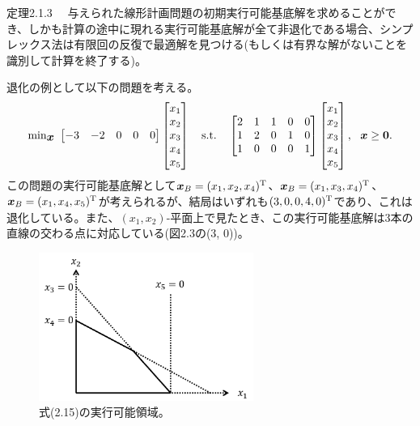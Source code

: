 \documentclass[dvipdfmx, 9pt, a4paper]{jsarticle}
\numberwithin{equation}{section}
\newcommand{\bm}[1]{{\mbox{\boldmath $#1$}}}
\begin{document}
\begin{itembox}[l]{定理2.1.3}
　与えられた線形計画問題の初期実行可能基底解を求めることができ、しかも計算の途中に現れる実行可能基底解が全て非退化である場合、シンプレックス法は有限回の反復で最適解を見つける(もしくは有界な解がないことを識別して計算を終了する)。
\end{itembox}\par
退化の例として以下の問題を考える。
\begin{equation}
{\rm min}_{\bm x}~
\begin{bmatrix}
-3 & -2 & 0 & 0 & 0
\end{bmatrix}
\begin{bmatrix}
x_1 \\ x_2 \\ x_3 \\ x_4 \\ x_5
\end{bmatrix}~~~
{\rm s.t.}~~~
\begin{bmatrix}
2 & 1 & 1 & 0 & 0 \\
1 & 2 & 0 & 1 & 0 \\
1 & 0 & 0 & 0 & 1
\end{bmatrix}
\begin{bmatrix}
x_1 \\ x_2 \\ x_3 \\ x_4 \\ x_5
\end{bmatrix},~~\bm x \geq \bm 0.
\end{equation}
この問題の実行可能基底解として$\bm x_B=(x_1, x_2, x_4)^{\rm T}$、$\bm x_B=(x_1, x_3, x_4)^{\rm T}$、$\bm x_B=(x_1, x_4, x_5)^{\rm T}$が考えられるが、結局はいずれも$(3,0,0,4,0)^{\rm T}$であり、これは退化している。また、$(x_1, x_2)$-平面上で見たとき、この実行可能基底解は3本の直線の交わる点に対応している(図2.3の(3, 0))。\par
\begin{figure}[b]
\begin{center}
\includegraphics[width=7cm]{fig3.png}
\caption{式(2.15)の実行可能領域。}
\end{center}
\end{figure}
\end{document}
